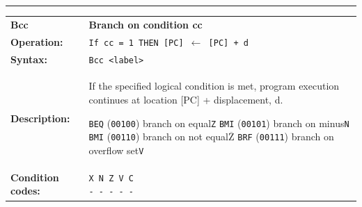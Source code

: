 \documentclass[]{article}
\newcommand{\textoverline}[1]{$\overline{\mbox{#1}}$}
\begin{document}
\begin{appendices}
\noindent\rule{10cm}{1pt}\newline %
\setlength\extrarowheight{5pt} %
\begin{tabularx}{\textwidth}{lL}
  {\Large \textbf{Bcc}} 	& {\Large \textbf{Branch on condition cc}}\\
  \textbf{Operation:} 		& \texttt{If cc = 1 THEN [PC] $\leftarrow$ [PC] + d}\\
  \textbf{Syntax:}  		& \texttt{Bcc <label>}\\
  \textbf{Description:}  	& If the specified logical condition is met, program execution
continues at location [PC] + displacement, d.\newline

\texttt{BEQ} (\texttt{00100}) {} {} branch on equal\hfill \texttt{Z}\newline
\texttt{BMI} (\texttt{00101}) {} {} branch on minus\hfill \texttt{N}\newline
\texttt{BMI} (\texttt{00110}) {} {} branch on not equal\hfill \texttt{\textoverline{Z}}\newline
\texttt{BRF} (\texttt{00111}) {} {} branch on overflow set\hfill \texttt{V}\newline
							  \\
  \textbf{Condition codes:} & \texttt{X N Z V C\newline - - - - -}\\
\end{tabularx}
\newline

\newpage


\end{appendices}
\end{document}
